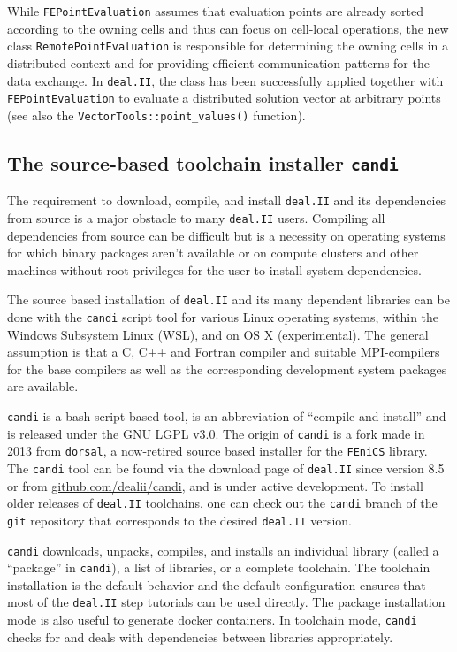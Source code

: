 \documentclass{ansarticle-preprint}
\newcommand{\specialword}[1]{\texttt{#1}}
\newcommand{\dealii}{{\specialword{deal.II}}\xspace}
\newcommand{\candi}{{\specialword{candi}}\xspace}
\begin{document}
While \texttt{FEPointEvaluation} assumes that evaluation points are already sorted according to 
the owning cells and thus can focus on cell-local operations, the new class
\texttt{RemotePointEvaluation} is responsible for determining the owning cells in a distributed
context and for providing efficient communication patterns for the data exchange. In \texttt{deal.II},
the class has been successfully applied together with \texttt{FEPointEvaluation} to evaluate a distributed
solution vector at arbitrary points (see also the
\texttt{VectorTools::point\_values()} function).


\subsection{The source-based toolchain installer \candi{}}
\label{subsec:candi}

The requirement to download, compile, and install \dealii{} and its dependencies from
source is a major obstacle to many \dealii{} users.
Compiling all dependencies from source can be difficult but is a necessity on operating systems for which
binary packages aren't available or on compute clusters and other machines
without root privileges for the user to install system dependencies.

The source based installation of \dealii{} and its many dependent libraries
can be done with the \candi{} script tool for various
Linux operating systems, within the Windows Subsystem Linux (WSL), and
on OS X (experimental).
%
The general assumption is that a C, C++ and Fortran compiler and suitable MPI-compilers
for the base compilers as well as the corresponding development system packages are
available.

\candi is a bash-script based tool, is an abbreviation of ``compile and install''
and is released under the GNU LGPL v3.0.
%
The origin of \candi{} is a fork made in 2013 from \texttt{dorsal},
a now-retired source based installer for the \texttt{FEniCS} library.
%
The \candi{} tool can be found via the download page of \dealii{} since version 8.5
or from \url{github.com/dealii/candi}, and is under active development.
To install older releases of \dealii{} toolchains, one can check out
the \candi{} branch of the \texttt{git} repository that
corresponds to the desired \dealii{} version.

\candi{} downloads, unpacks, compiles, and installs an individual
library (called a ``package'' in \candi{}), a list of libraries, or a complete toolchain.
The toolchain installation is the default behavior and the default configuration
ensures that most of the \dealii{} step tutorials can be used directly.
The package installation mode is also useful to generate docker containers.
In toolchain mode, \candi{} checks for and deals with
dependencies between libraries appropriately.
\end{document}

